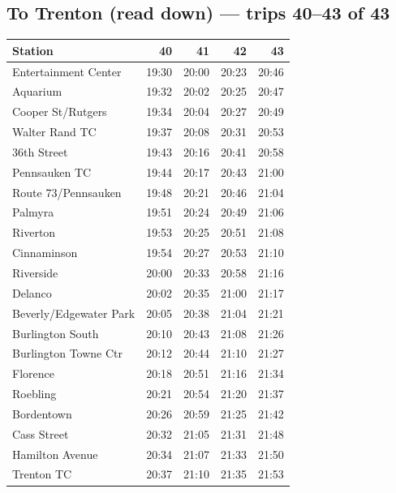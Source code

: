 \subsection*{To Trenton (read down) --- trips 40--43 of 43}
\begin{center}\footnotesize\setlength{\tabcolsep}{3pt}\begin{tabular}{@{}lrrrr@{}}\toprule
Station & 40 & 41 & 42 & 43 \\\midrule
Entertainment Center & 19:30 & 20:00 & 20:23 & 20:46 \\
Aquarium & 19:32 & 20:02 & 20:25 & 20:47 \\
Cooper St/Rutgers & 19:34 & 20:04 & 20:27 & 20:49 \\
Walter Rand TC & 19:37 & 20:08 & 20:31 & 20:53 \\
36th Street & 19:43 & 20:16 & 20:41 & 20:58 \\
Pennsauken TC & 19:44 & 20:17 & 20:43 & 21:00 \\
Route 73/Pennsauken & 19:48 & 20:21 & 20:46 & 21:04 \\
Palmyra & 19:51 & 20:24 & 20:49 & 21:06 \\
Riverton & 19:53 & 20:25 & 20:51 & 21:08 \\
Cinnaminson & 19:54 & 20:27 & 20:53 & 21:10 \\
Riverside & 20:00 & 20:33 & 20:58 & 21:16 \\
Delanco & 20:02 & 20:35 & 21:00 & 21:17 \\
Beverly/Edgewater Park & 20:05 & 20:38 & 21:04 & 21:21 \\
Burlington South & 20:10 & 20:43 & 21:08 & 21:26 \\
Burlington Towne Ctr & 20:12 & 20:44 & 21:10 & 21:27 \\
Florence & 20:18 & 20:51 & 21:16 & 21:34 \\
Roebling & 20:21 & 20:54 & 21:20 & 21:37 \\
Bordentown & 20:26 & 20:59 & 21:25 & 21:42 \\
Cass Street & 20:32 & 21:05 & 21:31 & 21:48 \\
Hamilton Avenue & 20:34 & 21:07 & 21:33 & 21:50 \\
Trenton TC & 20:37 & 21:10 & 21:35 & 21:53 \\
\bottomrule\end{tabular}\end{center}
